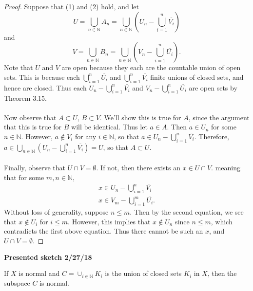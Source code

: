 \documentclass[a4paper,12pt,twoside]{hmcpset}
\begin{document}
\begin{proof}
    Suppose that (1) and (2) hold, and let 
    $$U =  \bigcup\limits_{n \in \mathbb{N}} A_n
    = \bigcup\limits_{n \in \mathbb{N}}
    \left(U_n - \bigcup\limits_{i = 1}^n \overline{V_i}\right)$$ 
    and 
    $$V = \bigcup\limits_{n \in \mathbb{N}} B_n 
    = \bigcup\limits_{n \in \mathbb{N}}
    \left(V_n - \bigcup\limits_{i = 1}^n \overline{U_i}\right).$$
    Note that $U$ and $V$ are open because they each
    are the countable union of open sets. This is because each
    $\bigcup\limits_{i = 1}^n\overline{U_i}$ and $\bigcup\limits_{i = 1}^n\overline{V_i}$ 
    finite unions of closed sets, and hence are closed.
    Thus each $U_n - \bigcup\limits_{i = 1}^n \overline{V_i}$ and 
    $V_n - \bigcup\limits_{i = 1}^n \overline{U_i}$ 
    are open sets by Theorem 3.15. 
    \\
    \\
    Now observe that $A \subset U$, $B \subset V$. We'll show this is
    true for $A$, since the argument that this is true for $B$ will be
    identical. Thus let $a \in A$. Then $a \in U_n$ for some $n \in
    \mathbb{N}$. However, $a \notin V_i$ for any $i \in \mathbb{N}$,
    so that $a \in U_n - \bigcup\limits_{i = 1}^n \overline{V_i}$.
    Therefore, $a \in \bigcup\limits_{n \in \mathbb{N}}
    \left(U_n - \bigcup\limits_{i = 1}^n \overline{V_i}\right) = U$,
    so that $A \subset U$.
    \\
    \\
    Finally, observe that $U \cap V = \emptyset$. If not, then there
    exists an $x \in U \cap V$. meaning that for some $m,n \in
    \mathbb{N}$, 
    \begin{align*}
        x \in U_n - \bigcup\limits_{i = 1}^n \overline{V_i}\\
        x \in V_m - \bigcup\limits_{i = 1}^m \overline{U_i}.
    \end{align*}
    Without loss of generality, suppose $n \le m$. Then by the second
    equation, we see that $x \notin U_i$ for $i \le m$. However, this
    implies that $x \notin U_n$ since $n \le m$, which contradicts the
    first above equation. Thus there cannot be such an $x$, and $U
    \cap V = \emptyset$.
\end{proof}
\textbf{Presented sketch 2/27/18}\\
\begin{problem}[Theorem 5.30] If $X$ is normal and $C = \cup_{i \in
    \mathbb{N}} K_i$ is the union of closed sets $K_i$ in $X$, then
    the subspace $C$ is normal. 
\end{problem}
\end{document}
